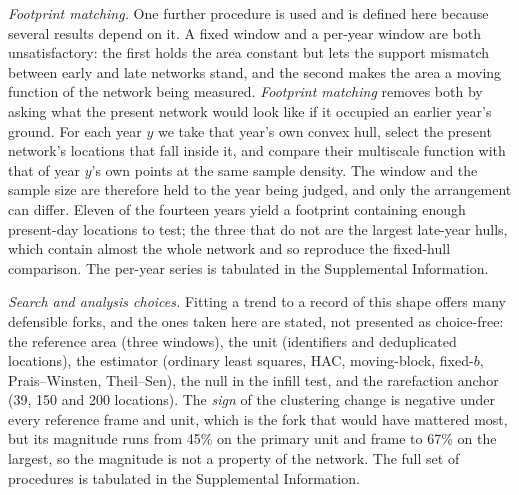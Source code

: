\documentclass[fleqn,10pt,lineno]{wlpeerj}
\newcommand{\rDrop}{67}
\newcommand{\locHullDrop}{45}
\begin{document}
\noindent\emph{Footprint matching.} One further procedure is used and is defined here because
several results depend on it. A fixed window and a per-year window are both unsatisfactory: the
first holds the area constant but lets the support mismatch between early and late networks
stand, and the second makes the area a moving function of the network being measured.
\emph{Footprint matching} removes both by asking what the present network would look like if it
occupied an earlier year's ground. For each year $y$ we take that year's own convex hull, select
the present network's locations that fall inside it, and compare their multiscale function with
that of year $y$'s own points at the same sample density. The window and the sample size are
therefore held to the year being judged, and only the arrangement can differ. Eleven of the
fourteen years yield a footprint containing enough present-day locations to test; the three that
do not are the largest late-year hulls, which contain almost the whole network and so reproduce
the fixed-hull comparison. The per-year series is tabulated in the Supplemental Information.

\noindent\emph{Search and analysis choices.} Fitting a trend to a record of this shape offers
many defensible forks, and the ones taken here are stated, not presented as
choice-free: the reference area (three windows), the unit (identifiers and deduplicated
locations), the estimator (ordinary least squares, HAC, moving-block, fixed-$b$, Prais--Winsten,
Theil--Sen), the null in the infill test, and the rarefaction anchor (39, 150 and 200 locations).
The \emph{sign} of the clustering change is negative under every reference frame and unit, which
is the fork that would have mattered most, but its magnitude runs from \locHullDrop\% on the
primary unit and frame to \rDrop\% on the largest, so the magnitude is not a property of the
network. The full set of procedures is tabulated in the Supplemental Information.
\end{document}
